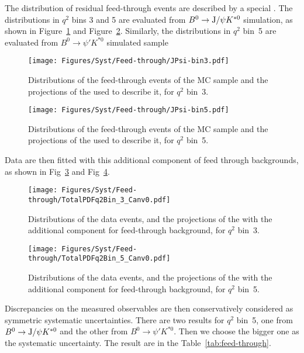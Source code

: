 The distribution of residual feed-through events are described by a special \pdf.
The distributions in $q^2$ bins 3 and 5 are evaluated from $B^0 \to {\rm J/}\psi K^{*0}$ simulation, as shown in Figure~\ref{fig:feed-J-bin3} and Figure~\ref{fig:feed-J-bin5}.
Similarly, the distributions in $q^2$ bin~5 are evaluated from $B^0 \to \psi' K^{*0}$ simulated sample


\begin{figure}[!hbt]
  \centering
  \texttt{[image: Figures/Syst/Feed-through/JPsi-bin3.pdf]}
  \caption{Distributions of the feed-through events of the \BtoKstJpsi MC sample and the projections of the \pdf used to describe it, for $q^2$ bin~3.
  }
  \label{fig:feed-J-bin3}
\end{figure}

\begin{figure}[!hbt]
  \centering
  \texttt{[image: Figures/Syst/Feed-through/JPsi-bin5.pdf]}
  \caption{Distributions of the feed-through events of the \BtoKstJpsi MC sample and the projections of the \pdf used to describe it, for $q^2$ bin~5.
  }
  \label{fig:feed-J-bin5}
\end{figure} 

Data are then fitted with this additional component of feed through backgrounds, as shown in Fig~\ref{fig:feed-t-bin3} and Fig~\ref{fig:feed-t-bin5}.

\begin{figure}[!hbt]
  \centering
  \texttt{[image: Figures/Syst/Feed-through/TotalPDFq2Bin\_3\_Canv0.pdf]}
  \caption{Distributions of the data events, and the projections of the \pdf with the additional component for feed-through background, for $q^2$ bin~3.}
  \label{fig:feed-t-bin3}
\end{figure}

\begin{figure}[!hbt]
  \centering
  \texttt{[image: Figures/Syst/Feed-through/TotalPDFq2Bin\_5\_Canv0.pdf]}
  \caption{Distributions of the data events, and the projections of the \pdf with the additional component for feed-through background, for $q^2$ bin~5.}
  \label{fig:feed-t-bin5}
\end{figure} 

Discrepancies on the measured observables are then conservatively considered as symmetric systematic uncertainties.
There are two results for $q^2$ bin~5, one from $B^0 \to {\rm J/}\psi K^{*0}$ and the other from $B^0 \to \psi' K^{*0}$.
Then we choose the bigger one as the systematic uncertainty.
The result are in the Table~\ref{tab:feed-through}.

